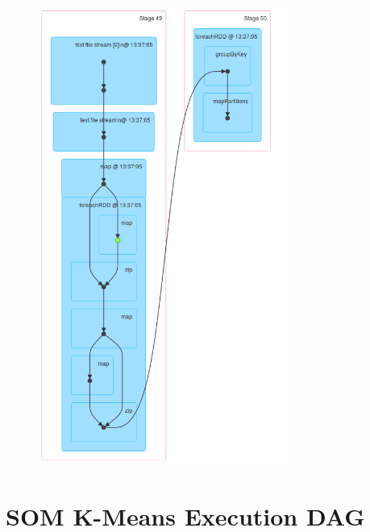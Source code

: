 \documentclass{l4proj}
\begin{document}
\begin{appendices}
\begin{figure}[H]
	\centering
    \includegraphics[width=0.73\textwidth]{images/DAG7}
    \label{fig:dag7}
\end{figure}

\section{SOM K-Means Execution DAG}


\end{appendices}
\end{document}
